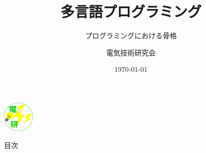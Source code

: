 \documentclass[dvipdfmx]{beamer}
\title{多言語プログラミング}
\subtitle{プログラミングにおける骨格}
\author[電研]{電気技術研究会}
\institute[NITNC]{NIT, Nara Collage}
\date[\today]{\today}
\begin{document}
\begin{frame}
  \titlepage
  \begin{flushright}
    \includegraphics[width=1.5cm]{pic/Logo(2).png}
    
  \end{flushright}
\end{frame}

\begin{frame}{目次}
  \tableofcontents
\end{frame}
\end{document}
